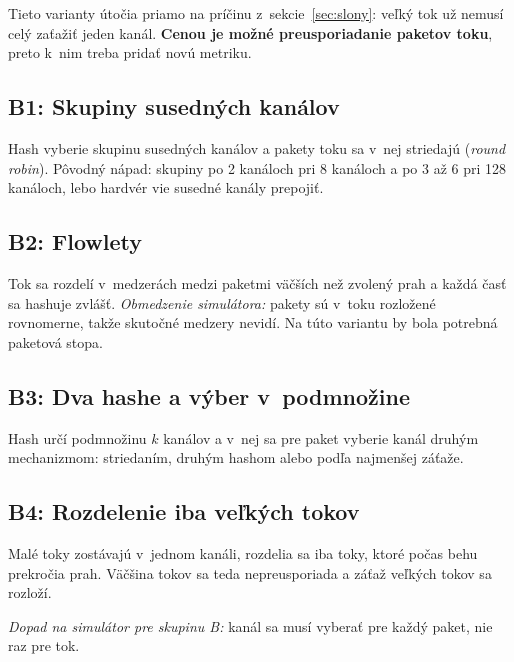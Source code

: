 Tieto varianty útočia priamo na príčinu z~sekcie~\ref{sec:slony}: veľký tok už nemusí celý
zaťažiť jeden kanál. \textbf{Cenou je možné preusporiadanie paketov toku}, preto k~nim treba
pridať novú metriku. 

\subsection*{B1: Skupiny susedných kanálov}
Hash vyberie skupinu susedných kanálov a pakety toku sa v~nej striedajú (\emph{round robin}).
Pôvodný nápad: skupiny po 2 kanáloch pri 8 kanáloch a po 3 až 6 pri 128 kanáloch, lebo hardvér
vie susedné kanály prepojiť.

\subsection*{B2: Flowlety}
Tok sa rozdelí v~medzerách medzi paketmi väčších než zvolený prah a každá časť sa hashuje zvlášť.
\emph{Obmedzenie simulátora:} pakety sú v~toku rozložené rovnomerne, takže skutočné medzery
nevidí. Na túto variantu by bola potrebná paketová stopa. 

\subsection*{B3: Dva hashe a výber v~podmnožine}
Hash určí podmnožinu $k$ kanálov a v~nej sa pre paket vyberie kanál druhým mechanizmom:
striedaním, druhým hashom alebo podľa najmenšej záťaže.

\subsection*{B4: Rozdelenie iba veľkých tokov}
Malé toky zostávajú v~jednom kanáli, rozdelia sa iba toky, ktoré počas behu prekročia prah.
Väčšina tokov sa teda nepreusporiada a záťaž veľkých tokov sa rozloží.

\emph{Dopad na simulátor pre skupinu B:} kanál sa musí vyberať pre každý paket, nie raz pre tok.

